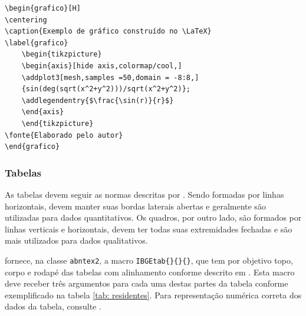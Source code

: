 

\begin{verbatim}
\begin{grafico}[H]
\centering
\caption{Exemplo de gráfico construído no \LaTeX}
\label{grafico}
    \begin{tikzpicture}
    \begin{axis}[hide axis,colormap/cool,]
    \addplot3[mesh,samples =50,domain = -8:8,]
    {sin(deg(sqrt(x^2+y^2)))/sqrt(x^2+y^2)};
    \addlegendentry{$\frac{\sin(r)}{r}$}
    \end{axis}
    \end{tikzpicture}
\fonte{Elaborado pelo autor}
\end{grafico}
\end{verbatim}

\subsubsection{Tabelas}
As tabelas devem seguir as normas descritas por \textcite{ibge1993}. Sendo formadas por linhas horizontais, devem manter suas bordas laterais abertas e geralmente são utilizadas para dados quantitativos. Os quadros, por outro lado, são formados por linhas verticais e horizontais, devem ter todas suas extremidades fechadas e são mais utilizados para dados qualitativos.

\textcite{abntex2classe} fornece, na classe \verb|abntex2|, a macro \verb|IBGEtab{}{}{}|, que tem por objetivo topo, corpo e rodapé das tabelas com alinhamento conforme descrito em \textcite{ibge1993}. Esta macro deve receber três argumentos para cada uma destas partes da tabela conforme exemplificado na tabela \ref{tab: residentes}. Para representação numérica correta dos dados da tabela, consulte \textcite{ibge1993}.

